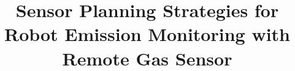 






\title{\Large Sensor Planning Strategies for \\Robot Emission Monitoring with Remote Gas Sensor}




